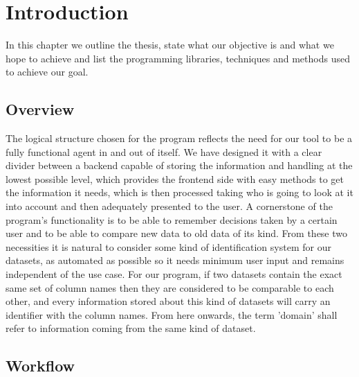 %
%

\chapter{Introduction}

\begin{resumen}
In this chapter we outline the thesis, state what our objective is and what we hope to achieve and list the programming libraries, techniques and methods used to achieve our goal.
\end{resumen}


\section{Overview}
\label{cap1:sec:overview}

The logical structure chosen for the program reflects the need for our tool to be a fully functional agent in and out of itself. We have designed it with a clear divider between a backend capable of storing the information and handling at the lowest possible level, which provides the frontend side with easy methods to get the information it needs, which is then processed taking who is going to look at it into account and then adequately presented to the user.
A cornerstone of the program's functionality is to be able to remember decisions taken by a certain user and to be able to compare new data to old data of its kind.
From these two necessities it is natural to consider some kind of identification system for our datasets, as automated as possible so it needs minimum user input and remains independent of the use case.
For our program, if two datasets contain the exact same set of column names then they are considered to be comparable to each other, and every information stored about this kind of datasets will carry an identifier with the column names.
From here onwards, the term 'domain' shall refer to information coming from the same kind of dataset.

\section{Workflow}
\label{cap1:sec:workflow}

